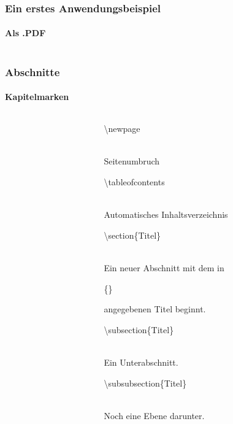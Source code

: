 \begin{frame}
\frametitle{Ein erstes Anwendungsbeispiel}
\framesubtitle{Als .PDF}
\begin{columns}
\begin{column}{0.5\textwidth}
\begin{ttfamily}\scriptsize

 \normalsize
\end{ttfamily}
\end{column}

\begin{column}{0.5\textwidth}
\end{column}
\end{columns}
\end{frame}



\begin{frame}
\frametitle{Abschnitte}
\framesubtitle{Kapitelmarken}
\begin{columns}
\begin{column}{0.5\textwidth}
\begin{ttfamily}\scriptsize

\end{ttfamily}
\end{column}
\begin{column}{0.5\textwidth}
\begin{ttfamily}\color{nounibaredI}\textbackslash newpage\color{black}\end{ttfamily}\\
Seitenumbruch\\[3mm]
\begin{ttfamily}\color{nounibaredI}\textbackslash tableofcontents\color{black}\end{ttfamily}\\
Automatisches Inhaltsverzeichnis\\[3mm]
\begin{ttfamily}\color{unibablueI}\textbackslash section\color{black}\{Titel\}\end{ttfamily}\\
Ein neuer Abschnitt mit dem in \begin{ttfamily}\{\}\end{ttfamily} angegebenen Titel
beginnt.\\[3mm]
\begin{ttfamily}\color{unibablueI}\textbackslash subsection\color{black}\{Titel\}\end{ttfamily}\\
Ein Unterabschnitt.\\[3mm]
\begin{ttfamily}\color{unibablueI}\textbackslash subsubsection\color{black}\{Titel\}\end{ttfamily}\\
Noch eine Ebene darunter.\\
\end{column}
\end{columns}
\end{frame}

